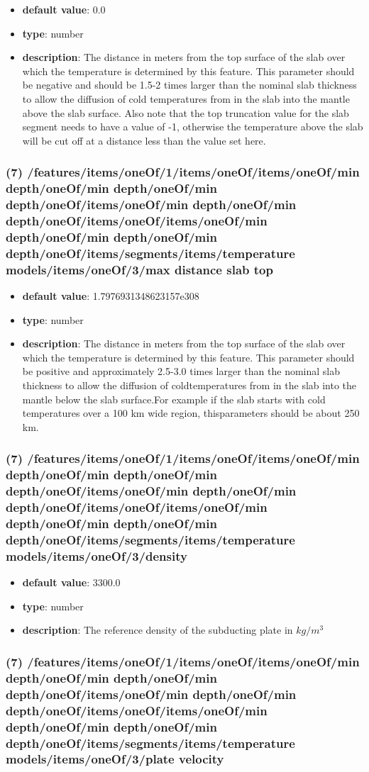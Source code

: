 \begin{itemize}[leftmargin=7em]\item {\bf default value}: 0.0
\item {\bf type}: number
\item {\bf description}: The distance in meters from the top surface of the slab over which the temperature is determined by this feature. This parameter should be negative and should be 1.5-2 times larger than the nominal slab thickness to allow the diffusion of cold temperatures from in the slab into the mantle above the slab surface. Also note that the top truncation value for the slab segment needs to have a value of -1, otherwise the temperature above the slab will be cut off at a distance less than the value set here.
\end{itemize}\subsubsection{(7) /features/items/oneOf/1/items/oneOf/items/oneOf/min depth/oneOf/min depth/oneOf/min depth/oneOf/items/oneOf/min depth/oneOf/min depth/oneOf/items/oneOf/items/oneOf/min depth/oneOf/min depth/oneOf/min depth/oneOf/items/segments/items/temperature models/items/oneOf/3/max distance slab top}
\begin{itemize}[leftmargin=7em]\item {\bf default value}: 1.7976931348623157e308
\item {\bf type}: number
\item {\bf description}: The distance in meters from the top surface of the slab over which the temperature is determined by this feature. This parameter should be positive and approximately 2.5-3.0 times larger than the nominal slab thickness to allow the diffusion of coldtemperatures from in the slab into the mantle below the slab surface.For example if the slab starts with cold temperatures over a 100 km wide region, thisparameters should be about 250 km.
\end{itemize}\subsubsection{(7) /features/items/oneOf/1/items/oneOf/items/oneOf/min depth/oneOf/min depth/oneOf/min depth/oneOf/items/oneOf/min depth/oneOf/min depth/oneOf/items/oneOf/items/oneOf/min depth/oneOf/min depth/oneOf/min depth/oneOf/items/segments/items/temperature models/items/oneOf/3/density}
\begin{itemize}[leftmargin=7em]\item {\bf default value}: 3300.0
\item {\bf type}: number
\item {\bf description}: The reference density of the subducting plate in $kg/m^3$
\end{itemize}\subsubsection{(7) /features/items/oneOf/1/items/oneOf/items/oneOf/min depth/oneOf/min depth/oneOf/min depth/oneOf/items/oneOf/min depth/oneOf/min depth/oneOf/items/oneOf/items/oneOf/min depth/oneOf/min depth/oneOf/min depth/oneOf/items/segments/items/temperature models/items/oneOf/3/plate velocity}
